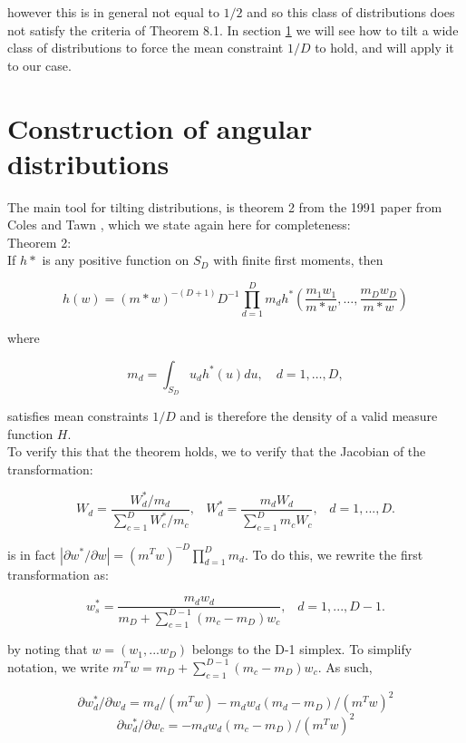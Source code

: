 \documentclass[10pt]{report}
\begin{document}
however this is in general not equal to $1/2$ and so this class of distributions does not satisfy the criteria of Theorem 8.1.
In section \ref{sec:tilting} we will see how to tilt a wide class of distributions to force the mean constraint $1/D$ to hold, and will apply it to our case.

\section{Construction of angular distributions}
\label{sec:tilting}

The main tool for tilting distributions, is theorem 2 from the 1991 paper from Coles and Tawn \cite{ColesTawn}, which we state again here for completeness:\\

Theorem 2:\\
If $h*$ is any positive function on $S_D$ with finite first moments, then

$$
h(w) = (m*w)^{-(D+1)}D^{-1}\prod_{d=1}^{D}m_dh^*\left(\frac{m_1w_1}{m*w}, \ldots , \frac{m_Dw_D}{m*w}\right)
$$

where

$$
m_d = \int_{S_D} u_dh^*(u)du, \quad d=1, \ldots ,D,
$$

satisfies mean constraints $1/D$ and is therefore the density of a valid measure function $H$.
\\

To verify this that the theorem holds, we to verify that the Jacobian of the transformation:

$$
W_d = \dfrac{W^*_d/m_d}{\sum_{c=1}^{D}W_c^*/m_c},\hspace{10pt}
W_d^* = \frac{m_dW_d}{\sum_{c=1}^{D}m_cW_c},\hspace{10pt}
d=1,...,D.
$$

is in fact $|\partial w^*/\partial w | = (m^Tw)^{-D} \prod_{d=1}^{D}m_d$.
To do this, we rewrite the first transformation as:

$$
w_s^* = \frac{m_dw_d}{m_D+\sum_{c=1}^{D-1}(m_c - m_D)w_c}, \hspace{10pt}
d=1,...,D-1.
$$

by noting that $w=(w_1,...w_D)$ belongs to the D-1 simplex. To simplify notation, we write
$m^Tw = m_D + \sum_{c=1}^{D-1}(m_c - m_D)w_c$. As such,

$$
\partial w_d^*/\partial w_d = m_d/(m^Tw) - m_dw_d(m_d - m_D)/(m^Tw)^2
$$
$$
\partial w_d^*/\partial w_c = - m_dw_d (m_c - m_D)/(m^Tw)^2
$$
\end{document}
